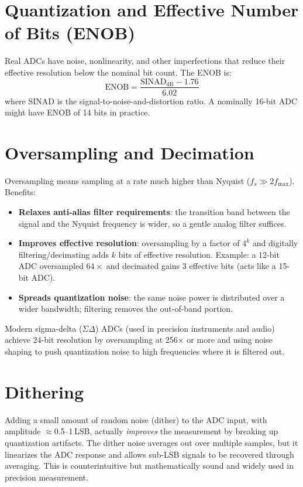 \documentclass[11pt,letterpaper,twoside,openany]{book}
\begin{document}
\section{Quantization and Effective Number of Bits (ENOB)}
Real ADCs have noise, nonlinearity, and other imperfections that reduce their effective resolution below the nominal bit count. The ENOB is:
\begin{equation}
\text{ENOB} = \frac{\text{SINAD}_{\text{dB}} - 1.76}{6.02}
\end{equation}
where SINAD is the signal-to-noise-and-distortion ratio. A nominally 16-bit ADC might have ENOB of 14 bits in practice.


\section{Oversampling and Decimation}
Oversampling means sampling at a rate much higher than Nyquist ($f_s \gg 2f_{\max}$). Benefits:

\begin{itemize}[leftmargin=1.5em]
\item \textbf{Relaxes anti-alias filter requirements}: the transition band between the signal and the Nyquist frequency is wider, so a gentle analog filter suffices.
\item \textbf{Improves effective resolution}: oversampling by a factor of $4^k$ and digitally filtering/decimating adds $k$ bits of effective resolution. Example: a 12-bit ADC oversampled $64\times$ and decimated gains 3 effective bits (acts like a 15-bit ADC).
\item \textbf{Spreads quantization noise}: the same noise power is distributed over a wider bandwidth; filtering removes the out-of-band portion.
\end{itemize}

Modern sigma-delta ($\Sigma\Delta$) ADCs (used in precision instruments and audio) achieve 24-bit resolution by oversampling at 256$\times$ or more and using noise shaping to push quantization noise to high frequencies where it is filtered out.

\section{Dithering}
Adding a small amount of random noise (dither) to the ADC input, with amplitude $\approx$0.5--1\,LSB, actually \emph{improves} the measurement by breaking up quantization artifacts. The dither noise averages out over multiple samples, but it linearizes the ADC response and allows sub-LSB signals to be recovered through averaging. This is counterintuitive but mathematically sound and widely used in precision measurement.
\end{document}

